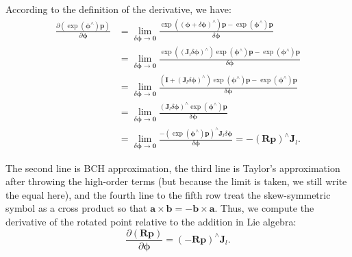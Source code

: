 According to the definition of the derivative, we have:
\begin{align*}
\frac{{\partial \left( {\exp \left( {{ \boldsymbol{\phi} ^ \wedge }} \right) \mathbf{p}} \right)}}{{\partial \boldsymbol{\phi} }} &= \mathop {\lim }\limits_{\delta \boldsymbol{\phi}  \to \mathbf{0}} \frac{{\exp \left( {{{\left( {\boldsymbol{\phi}  + \delta \boldsymbol{\phi} } \right)}^ \wedge }} \right) \mathbf{p} - \exp \left( {{\boldsymbol{\phi} ^ \wedge }} \right)\mathbf{p}}}{{\delta \boldsymbol{\phi} }}\\
& = \mathop {\lim }\limits_{\delta \boldsymbol{\phi}  \to \mathbf{0}} \frac{{\exp \left( {{{\left( {{\mathbf{J}_l}\delta \boldsymbol{\phi} } \right)}^ \wedge }} \right)\exp \left( {{\boldsymbol{\phi} ^ \wedge }} \right) \mathbf{p} - \exp \left( {{\boldsymbol{\phi} ^ \wedge }} \right) \mathbf{p}}}{{\delta \boldsymbol{\phi} }}\\
&= \mathop {\lim }\limits_{\delta \boldsymbol{\phi}  \to \mathbf{0}} \frac{{\left( { \mathbf{I} + {{\left( {{ \mathbf{J}_l}\delta \boldsymbol{\phi} } \right)}^ \wedge }} \right)\exp \left( {{\boldsymbol{\phi} ^ \wedge }} \right) \mathbf{p} - \exp \left( {{\boldsymbol{\phi} ^ \wedge }} \right)\mathbf{p}}}{{\delta \boldsymbol{\phi} }}\\
&= \mathop {\lim }\limits_{\delta \boldsymbol{\phi}  \to \mathbf{0}} \frac{{{{\left( {{\mathbf{J}_l}\delta \boldsymbol{\phi} } \right)}^ \wedge }\exp \left( {{\boldsymbol{\phi} ^ \wedge }} \right)\mathbf{p}}}{{\delta \boldsymbol{\phi} }}\\
&= \mathop {\lim }\limits_{\delta \boldsymbol{\phi}  \to \mathbf{0}} \frac{{ - {{\left( {\exp \left( {{\boldsymbol{\phi} ^ \wedge }} \right)\mathbf{p}} \right)}^ \wedge }{\mathbf{J}_l}\delta \boldsymbol{\phi} }}{{\delta \boldsymbol{\phi}}} =  - {\left( {\mathbf{Rp}} \right)^ \wedge }{\mathbf{J}_l}.
\end{align*}

The second line is BCH approximation, the third line is Taylor's approximation after throwing the high-order terms (but because the limit is taken, we still write the equal here), and the fourth line to the fifth row treat the skew-symmetric symbol as a cross product so that $\mathbf{a} \times \mathbf{b} = -\mathbf{b} \times \mathbf{a}$. Thus, we compute the derivative of the rotated point relative to the addition in Lie algebra:
\begin{equation}
\frac{{\partial \left( { \mathbf{Rp}} \right)}}{{\partial \boldsymbol{\phi} }} = {\left( { - \mathbf{Rp}} \right)^ \wedge }{\mathbf{J}_l}.
\end{equation}

